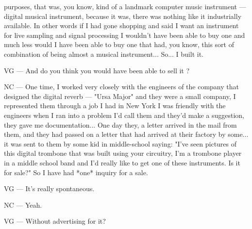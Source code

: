 purposes, that was, you know, kind of a landmark computer music instrument — digital musical instrument, because it was, there was nothing like it industrially available. In other words if I had gone shopping and said I want an instrument for live sampling and signal processing I wouldn't have been able to buy one and much less would I have been able to buy one that had, you know, this sort of combination of being almost a musical instrument... So... I built it. 

VG — And do you think you would  have been able to sell it ? 

NC — One time, I worked very closely with the engineers of the company that designed the digital reverb — "Ursa Major" and they were a small company, I represented them through a job I had in New York I was friendly with the engineers when I ran into a problem I'd call them and they'd make a suggestion, they gave me documentation... One day they, a letter arrived in the mail from them, and they had passed on a letter that had arrived at their factory by some... it was sent to them by some kid in middle-school saying: "I've seen pictures of this digital trombone that was built using your circuitry, I'm a trombone player in a middle school band and I'd really like to get one of these instruments. Is it for sale?" So I have had *one* inquiry for a sale. 

VG — It's really spontaneous. 

NC — Yeah. 

VG — Without advertising for it?  

